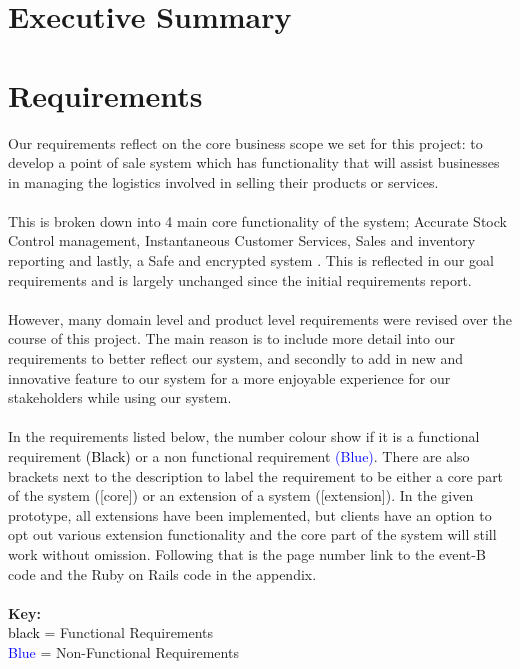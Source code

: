 \documentclass[a4paper]{article}
\begin{document}
\tableofcontents
\pagebreak


\setcounter{page}{1}     %
\renewcommand{\thepage}{\arabic{page}}  %


\section{Executive Summary}


\section{Requirements}
Our requirements reflect on the core business scope we set for this project: to develop a point of sale system which has functionality that will assist businesses in managing the logistics
involved in selling their products or services. 
\\\\
This is broken down into 4 main core functionality of the system;  Accurate Stock Control management, Instantaneous Customer Services, Sales and inventory reporting and lastly, a Safe and encrypted system . This is reflected in our goal requirements and is largely unchanged since the initial requirements report. 
\\\\
However, many domain level and product level requirements were revised over the course of this project. The main reason is to include more detail into our requirements to better reflect our system, and secondly to add in new and innovative feature to our system for a more enjoyable experience for our stakeholders while using our system. 
\\\\
In the requirements listed below, the number colour show if it is a functional requirement \textcolor{black}{(Black)} or a non functional requirement \textcolor{blue} {(Blue)}. There are also brackets next to the description to label the requirement to be either a core part of the system ([core]) or an extension of a system ([extension]). In the given prototype, all extensions have been implemented, but clients have an option to opt out various extension functionality and the core part of the system will still work without omission. Following that is the page number link to the event-B code and the Ruby on Rails code in the appendix.
\\\\
\textbf{Key:}\\
\textcolor{black}{black} = Functional Requirements\\
\textcolor{blue} {Blue} = Non-Functional Requirements\\
\end{document}
